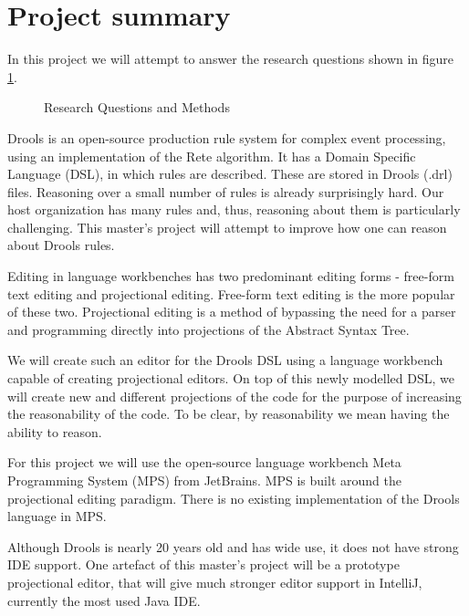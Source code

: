 \section{Project summary}

In this project we will attempt to answer the research questions shown in figure \ref{fig:Research_Questions}.
\begin{figure}[H]
    \centering
    \caption{Research Questions and Methods}
    \label{fig:Research_Questions}
\end{figure}


Drools\cite{browne2009jboss} is an open-source production rule system for complex event processing, using an implementation of the Rete algorithm\cite{forgy1989rete}.
It has a Domain Specific Language (DSL), in which rules are described.
These are stored in Drools (.drl) files. 
Reasoning over a small number of rules is already surprisingly hard.
Our host organization has many rules and, thus, reasoning about them is particularly challenging.
This master's project will attempt to improve how one can reason about Drools rules.

Editing in language workbenches has two predominant editing forms - free-form text editing and projectional editing\cite{erdweg2013state}.
Free-form text editing is the more popular of these two.
Projectional editing is a method of bypassing the need for a parser and programming directly into projections of the Abstract Syntax Tree.

We will create such an editor for the Drools DSL using a language workbench capable of creating projectional editors.  
On top of this newly modelled DSL, we will create new and different projections of the code for the purpose of increasing the reasonability of the code. 
To be clear, by reasonability we mean having the ability to reason.

For this project we will use the open-source language workbench Meta Programming System (MPS) from JetBrains\cite{MPS_ProductPage}.
MPS is built around the projectional editing paradigm.
There is no existing implementation of the Drools language in MPS.

Although Drools is nearly 20 years old and has wide use, it does not have strong IDE support.
One artefact of this master's project will be a prototype projectional editor, that will give much stronger editor support in IntelliJ, currently the most used Java IDE\cite{Java_usage_report}.
